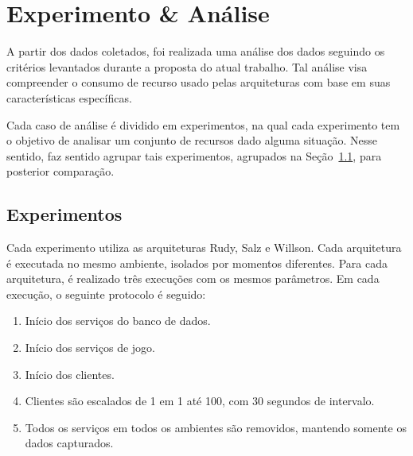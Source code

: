 \chapter{Experimento \& Análise}
\label{cap6}



A partir dos dados coletados, foi realizada uma análise dos dados seguindo os critérios levantados durante a proposta do atual trabalho.
%
Tal análise visa compreender o consumo de recurso usado pelas arquiteturas com base em suas características específicas.



Cada caso de análise é dividido em experimentos, na qual cada experimento tem o objetivo de analisar um conjunto de recursos dado alguma situação.
%
Nesse sentido, faz sentido agrupar tais experimentos, agrupados na Seção~\ref{sec:experimentos}, para posterior comparação.





\section{Experimentos}
\label{sec:experimentos}



Cada experimento utiliza as arquiteturas Rudy, Salz e Willson.
%
Cada arquitetura é executada no mesmo ambiente, isolados por momentos diferentes.
%
Para cada arquitetura, é realizado três execuções com os mesmos parâmetros.
%
Em cada execução, o seguinte protocolo é seguido:



\begin{enumerate}
 \item Início dos serviços do banco de dados.
 \item Início dos serviços de jogo.
 \item Início dos clientes.
 \item Clientes são escalados de 1 em 1 até 100, com 30 segundos de intervalo.
 \item Todos os serviços em todos os ambientes são removidos, mantendo somente os dados capturados.
\end{enumerate}



